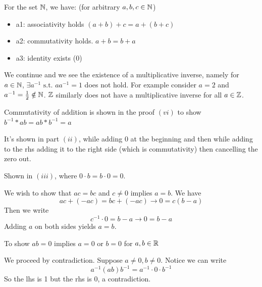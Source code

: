 \begin{example}[3.1]
For the set $\mathbb{N}$, we have: (for arbitrary $a, b, c \in \mathbb{N}$)
\begin{itemize}
    \item a1: associativity holds $(a + b) + c = a+(b+c)$
    \item a2: commutativity holds. $a + b = b + a$
    \item a3: identity exists (0)

\end{itemize}

We continue and we see the existence of a multiplicative inverse, namely for
$a \in \mathbb{N}$, $\exists a^{-1} \text{ s.t. } aa^{-1} = 1$ does not hold. For example
consider $a = 2$ and $a^{-1} = \frac{1}{2} \notin \mathbb{N}$.
$\mathbb{Z}$ similarly does not have a multiplicative inverse for all $a \in \mathbb{Z}$.
\end{example}
\begin{example}[3.2]
Commutativity of addition is shown in the proof $(vi)$ to show $b^{-1} * ab = ab *
b^{-1} = a$
\par It's shown in part $(ii)$, while adding $0$ at the beginning and then while
adding to the rhs adding it to the right side (which is commutativity) then cancelling
the zero out.
\par Shown in $(iii)$, where $0 \cdot b = b \cdot 0 = 0.$
\end{example}
\begin{example}[3.3]
We wish to show that $ac= bc$ and $c \ne 0$ implies $a = b.$
We have $$ac + (-ac) = bc + (-ac) \rightarrow 0 = c(b - a)$$
Then we write $$c^{-1} \cdot 0 = b - a \rightarrow 0 = b - a$$
Adding $a$ on both sides yields $a = b$.

 To show $ab = 0$ implies $a = 0$ or $b = 0$ for $a, b \in \mathbb{R}$
\par We proceed by contradiction. Suppose $a \ne 0, b \ne 0.$
Notice we can write $$a^{-1} (ab) b^{-1} = a^{-1} \cdot 0 \cdot b^{-1}$$
So the lhs is 1 but the rhs is 0, a contradiction.
\end{example}
